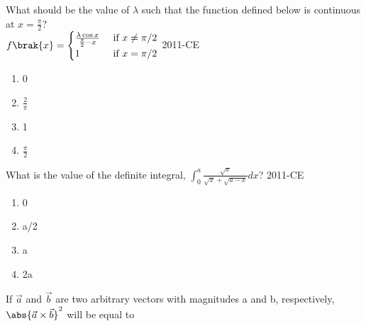 
\iffalse
		\section{ce}
		\author{ai24btech11036}
		\chapter{2011}
\fi


\item What should be the value of $\lambda$ such that the function defined below is continuous at $x=\frac{\pi}{2}$?\\
$f\brak{x}=
\begin{cases}
\frac{\lambda \cos x}{\frac{\pi}{2}-x} & \text{ if } x\neq \pi /2 \\
1 & \text{ if } x=\pi /2 \\
\end{cases}$
		\hfill{2011-CE}
	\begin{multicols}{4}
	\begin{enumerate}
		\item 0
		\item $\frac{2}{\pi}$
		\item 1
		\item $\frac{\pi}{2}$
	\end{enumerate}
	\end{multicols}

\item What is the value of the definite integral, $\int_{0}^{a} \frac{\sqrt{x}}{\sqrt{x}+\sqrt{a-x}} dx$?
	\hfill{2011-CE}

	\begin{multicols}{4}
	\begin{enumerate}
		\item 0
		\item a/2
		\item a
		\item 2a
	\end{enumerate}
	\end{multicols}

\item If $\vec{a}$ and $\vec{b}$ are two arbitrary vectors with magnitudes a and b, respectively, $\abs{\vec{a} \times \vec{b}}^2$ will be equal to

